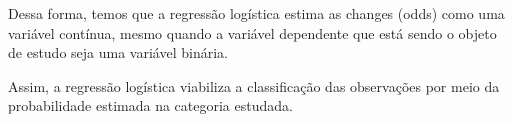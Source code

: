 Dessa forma, temos que a regressão logística estima as changes (odds) como uma variável contínua, mesmo quando a variável dependente que está sendo o objeto de estudo seja uma variável binária. 

Assim, a regressão logística viabiliza a classificação das observações por meio da probabilidade estimada na categoria estudada.
